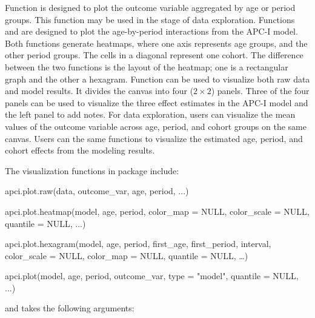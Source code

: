 Function {} is designed to plot the outcome variable aggregated by age or period groups. This function may be used in the stage of data exploration. Functions {} and {} are designed to plot the age-by-period interactions from the APC-I model. Both functions generate heatmaps, where one axis represents age groups, and the other period groups. The cells in a diagonal represent one cohort. The difference between the two functions is the layout of the heatmap; one is a rectangular graph and the other a hexagram. Function {} can be used to visualize both raw data and model results. It divides the canvas into four ($2 \times 2$) panels.  Three of the four panels can be used to visualize the three effect estimates in the APC-I model and the left panel to add notes. For data exploration, users can visualize the mean values of the outcome variable across age, period, and cohort groups on the same canvas. Users can the same functions to visualize the estimated age, period, and cohort effects from the modeling results.

The visualization functions in package {} include:
\begin{example}
	apci.plot.raw(data, outcome_var, age, period, ...)

	apci.plot.heatmap(model, age, period, color_map = NULL, color_scale = NULL, 
		quantile = NULL, ...)

	apci.plot.hexagram(model, age, period, first_age, first_period, interval, 
		color_scale = NULL, color_map = NULL, quantile = NULL, …)

	apci.plot(model, age, period, outcome_var, type = "model", quantile = NULL, 
		...)

\end{example}

and takes the following arguments:

